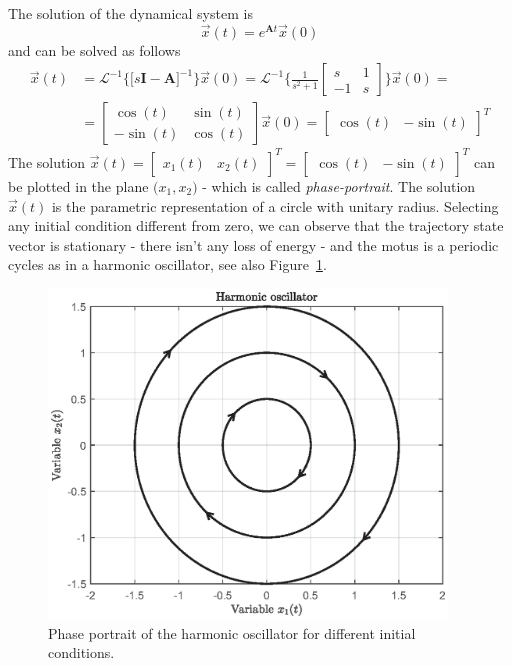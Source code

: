 \documentclass[11pt,a4paper,oneside]{book}
\numberwithin{equation}{section}
\theoremstyle{it}
\theoremstyle{definition}
\begin{document}
The solution of the dynamical system is 
\begin{equation}
	\vec{x}(t) = e^{\mathbf{A}t}\vec{x}(0)
\end{equation}
and can be solved as follows
\begin{equation}
	\begin{aligned}
		\vec{x}(t) &= 
		\mathcal{L}^{-1}\Big\{\Big[s\mathbf{I}-\mathbf{A}\Big]^{-1}\Big\}\vec{x}(0)
		 = \mathcal{L}^{-1}\Big\{\frac{1}{s^2+1}\begin{bmatrix} s & 1 \\ -1 & s 
		\end{bmatrix}\Big\}\vec{x}(0) = \\[6pt]
		&= \begin{bmatrix} \cos(t) & \sin(t) \\ -\sin(t) & \cos(t) 
		\end{bmatrix}\vec{x}(0) = \begin{bmatrix} \cos(t) & -\sin(t) 
		\end{bmatrix}^T
	\end{aligned}
\end{equation}
The solution $\vec{x}(t) = \begin{bmatrix} x_1(t) & x_2(t) \end{bmatrix}^T = 
\begin{bmatrix} \cos(t) & -\sin(t) \end{bmatrix}^T$ can be plotted in the plane 
$\big(x_1 , x_2\big)$ - which is called \textit{phase-portrait}. The solution 
$\vec{x}(t)$ is the parametric representation of a circle with unitary radius. 
Selecting any initial condition different from zero, we can observe that the 
trajectory state vector is stationary - there isn't any loss of energy - and 
the motus is a periodic cycles as in a harmonic oscillator, see also 
Figure~\ref{armonic_oscillator}.
\begin{figure}[H]
	\centering
	\includegraphics[width = 300pt, 
	keepaspectratio]{figures/ljapunov/harmonic_oscillator.eps}
	\captionsetup{width=0.75\textwidth}		
	\caption{Phase portrait of the harmonic oscillator for different initial 
	conditions.}
	\label{armonic_oscillator}
\end{figure}
\end{document}
